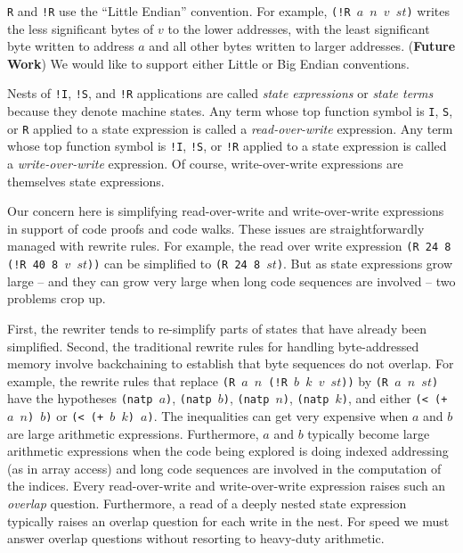 \documentclass[submission,copyright,creativecommons]{eptcs}
\newcommand{\ptt}[1]{\tt{#1}}
\begin{document}
{\ptt{R}} and {\ptt{!R}} use the ``Little Endian'' convention.  For example,
{\ptt{(!R $a$ $n$ $v$ $st$)}} writes the less significant bytes of $v$ to the lower
addresses, with the least significant byte written to address $a$ and all
other bytes written to larger addresses.  ({\bf{Future Work}}) We would like
to support either Little or Big Endian conventions.

Nests of {\ptt{!I}}, {\ptt{!S}}, and {\ptt{!R}} applications are called
{\em{state expressions}} or {\em{state terms}} because they denote machine
states.  Any term whose top function symbol is {\ptt{I}}, {\ptt{S}}, or
{\ptt{R}} applied to a state expression is called a {\em{read-over-write}}
expression.  Any term whose top function symbol is {\ptt{!I}}, {\ptt{!S}}, or
{\ptt{!R}} applied to a state expression is called a {\em{write-over-write}}
expression.  Of course, write-over-write expressions are themselves state
expressions.  

Our concern here is simplifying read-over-write and write-over-write
expressions in support of code proofs and code walks.  These issues are
straightforwardly managed with rewrite rules.  For example, the read over
write expression {\ptt{(R 24 8 (!R 40 8 $v$ $st$))}} can be simplified to
{\ptt{(R 24 8 $st$)}}. But as state expressions grow large -- and they
can grow very large when long code sequences are involved -- two problems
crop up.

First, the rewriter tends to re-simplify parts of states that have already
been simplified.  Second, the traditional rewrite rules for handling byte-addressed memory
involve backchaining to establish that byte sequences do not overlap.  For
example, the rewrite rules that replace {\ptt{(R $a$ $n$ (!R $b$ $k$ $v$
    $st$))}} by {\ptt{(R $a$ $n$ $st$)}} have the hypotheses {\ptt{(natp
    $a$)}}, {\ptt{(natp $b$)}}, {\ptt{(natp $n$)}}, {\ptt{(natp $k$)}}, and
either {\ptt{(< (+ $a$ $n$) $b$)}} or {\ptt{(< (+ $b$ $k$) $a$)}}.  The
inequalities can get very expensive when $a$ and $b$ are large arithmetic
expressions.  Furthermore, $a$ and $b$ typically become large arithmetic
expressions when the code being explored is doing indexed addressing (as in
array access) and long code sequences are involved in the computation of the
indices.  Every read-over-write and write-over-write expression raises such
an {\em{overlap}} question.  Furthermore, a read of a deeply nested state
expression typically raises an overlap question for each write in the nest.
For speed we must answer overlap questions without resorting to heavy-duty arithmetic.
\end{document}
